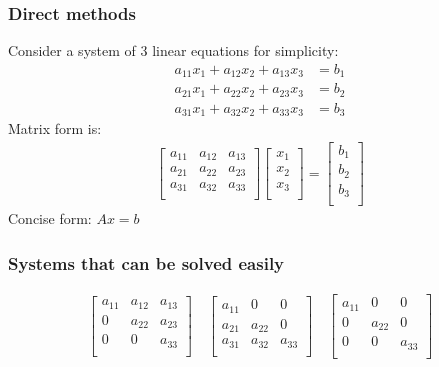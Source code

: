 \documentclass[notes]{beamer}
\begin{document}
\begin{frame}
	\frametitle{Direct methods}
	Consider a system of 3 linear equations for simplicity:
	\begin{align*}
	a_{11} x_1 + a_{12} x_2 + a_{13} x_3 & = b_1 \\
	a_{21} x_1 + a_{22} x_2 + a_{23} x_3 & = b_2 \\
	a_{31} x_1 + a_{32} x_2 + a_{33} x_3 & = b_3
	\end{align*}
	Matrix form is:
	\begin{align*}
		\begin{bmatrix}
		a_{11} & a_{12} & a_{13} \\
		a_{21} & a_{22} & a_{23} \\
		a_{31} & a_{32} & a_{33} \\
		\end{bmatrix}
		\begin{bmatrix}
		x_1 \\
		x_2 \\
		x_3 \\
		\end{bmatrix} = 
		\begin{bmatrix}
		b_1 \\
		b_2 \\
		b_3 \\
		\end{bmatrix}
	\end{align*}
	Concise form: $A x = b$
	
\end{frame}

\begin{frame}
	\frametitle{Systems that can be solved easily}

	\begin{align*}
	\begin{bmatrix}
	a_{11} & a_{12} & a_{13} \\
	0 & a_{22} & a_{23} \\
	0 & 0 & a_{33} \\
	\end{bmatrix}
	\quad
	\begin{bmatrix}
	a_{11} & 0 & 0 \\
	a_{21} & a_{22} & 0 \\
	a_{31} & a_{32} & a_{33} \\
	\end{bmatrix}
	\quad
	\begin{bmatrix}
	a_{11} & 0 & 0 \\
	0 & a_{22} & 0 \\
	0 & 0 & a_{33} \\
	\end{bmatrix}
	\end{align*}
\end{frame}
\end{document}
